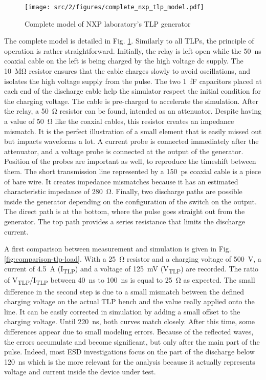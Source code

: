 \begin{figure}[!h]
  \centering
  \texttt{[image: src/2/figures/complete\_nxp\_tlp\_model.pdf]}
  \caption{Complete model of NXP laboratory's TLP generator}
  \label{fig:complete-tlp-model}
\end{figure}

The complete model is detailed in Fig. \ref{fig:complete-tlp-model}.
Similarly to all TLPs, the principle of operation is rather straightforward.
Initially, the relay is left open while the \SI{50}{\nano\second} coaxial cable on the left is being charged by the high voltage \gls{dc} supply.
The \SI{10}{\mega\ohm} resistor ensures that the cable charges slowly to avoid oscillations, and isolates the high voltage supply from the pulse.
The two \SI{1}{\femto\farad} capacitors placed at each end of the discharge cable help the simulator respect the initial condition for the charging voltage.
The cable is pre-charged to accelerate the simulation.
After the relay, a \SI{50}{\ohm} resistor can be found, intended as an attenuator.
Despite having a value of \SI{50}{\ohm} like the coaxial cables, this resistor creates an impedance mismatch.
It is the perfect illustration of a small element that is easily missed out but impacts waveforms a lot.
A current probe is connected immediately after the attenuator, and a voltage probe is connected at the output of the generator.
Position of the probes are important as well, to reproduce the timeshift between them.
The short transmission line represented by a \SI{150}{\pico\second} coaxial cable is a piece of bare wire.
It creates impedance mismatches because it has an estimated characteristic impedance of \SI{280}{\ohm}.
Finally, two discharge paths are possible inside the generator depending on the configuration of the switch on the output.
The direct path is at the bottom, where the pulse goes straight out from the generator.
The top path provides a series resistance that limits the discharge current.

A first comparison between measurement and simulation is given in Fig. \ref{fig:comparison-tlp-load}.
With a \SI{25}{\ohm} resistor and a charging voltage of \SI{500}{\volt}, a current of \SI{4.5}{\ampere} (I\textsubscript{TLP}) and a voltage of \SI{125}{\milli\volt} (V\textsubscript{TLP}) are recorded.
The ratio of V\textsubscript{TLP}/I\textsubscript{TLP} between \SI{40}{\nano\second} to \SI{100}{\nano\second} is equal to \SI{25}{\ohm} as expected.
The small difference in the second step is due to a small mismatch between the defined charging voltage on the actual TLP bench and the value really applied onto the line.
It can be easily corrected in simulation by adding a small offset to the charging voltage.
Until \SI{220}{\nano\second}, both curves match closely.
After this time, some differences appear due to small modeling errors.
Because of the reflected waves, the errors accumulate and become significant, but only after the main part of the pulse.
Indeed, most ESD investigations focus on the part of the discharge below \SI{120}{\nano\second} which is the more relevant for the analysis because it actually represents voltage and current inside the device under test.

